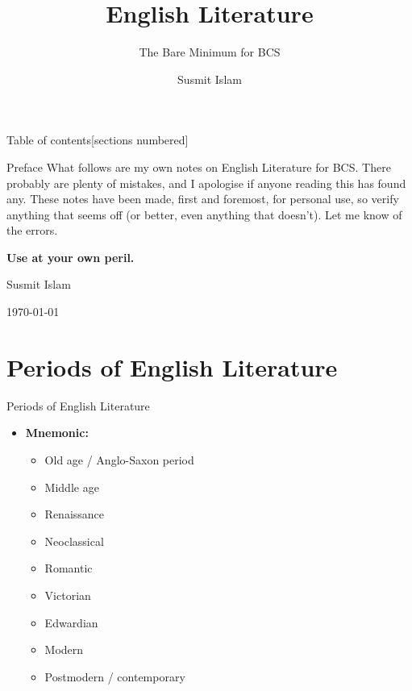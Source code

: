 \documentclass[
  12pt,
  ignorenonframetext,
  progressbar=frametitle]{beamer}
\title{English Literature}
\subtitle{The Bare Minimum for BCS}
\author{Susmit Islam}
\date{}
\institute{Sir Salimullah Medical College}
\providecommand{\tightlist}{%
  \setlength{\itemsep}{0pt}\setlength{\parskip}{0pt}}
\begin{document}
\frame{\titlepage}
\begin{frame}[t,allowframebreaks]
{Table of contents}[sections numbered]

\tableofcontents[hideallsubsections]
\end{frame}


\begin{frame}[allowframebreaks]
{Preface}
What follows are my own notes on English Literature for BCS. There
probably are plenty of mistakes, and I apologise if anyone reading this
has found any. These notes have been made, first and foremost, for
personal use, so verify anything that seems off (or better, even
anything that doesn't). Let me know of the errors.

\textbf{Use at your own peril.}

\hfill Susmit Islam

\hfill \today
\end{frame}

\section{Periods of English Literature}
\begin{frame}[allowframebreaks]
{Periods of English Literature}
\begin{itemize}
\tightlist
\item
  \textbf{Mnemonic:} 

  \begin{itemize}
  \tightlist
  \item
    Old age / Anglo-Saxon period
  \item
    Middle age
  \item
    Renaissance
  \item
    Neoclassical
  \item
    Romantic
  \item
    Victorian
  \item
    Edwardian
  \item
    Modern
  \item
    Postmodern / contemporary
  \end{itemize}
\end{itemize}
\end{frame}
\end{document}
